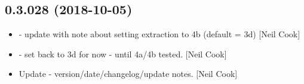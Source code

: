 \documentclass[a4paper,10pt,english]{report}
\begin{document}
\subsection{0.3.028 (2018-10-05)}
\label{\detokenize{misc/changelog:id304}}\begin{itemize}
\item {} 
 - update with note about setting extraction to 4b
(default = 3d) {[}Neil Cook{]}

\item {} 
 - set  back to 3d for now -
until 4a/4b tested. {[}Neil Cook{]}

\item {} 
Update - version/date/changelog/update notes. {[}Neil Cook{]}

\end{itemize}
\end{document}
